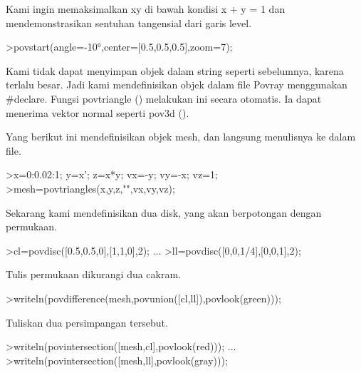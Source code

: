 \documentclass{article}
\begin{document}
\begin{eulernotebook}
\begin{eulercomment}
\begin{eulercomment}
\begin{eulercomment}
\begin{eulercomment}
\begin{eulercomment}
\begin{eulercomment}
\begin{eulercomment}
\begin{eulercomment}
\begin{eulercomment}
\begin{eulercomment}
\begin{eulercomment}
\begin{eulercomment}
\begin{eulercomment}
\begin{eulercomment}
\begin{eulercomment}
\begin{eulercomment}
\begin{eulercomment}
\begin{eulercomment}
\begin{eulercomment}
\begin{eulercomment}
\begin{eulercomment}
\begin{eulercomment}
\begin{eulercomment}
\begin{eulercomment}
\begin{eulercomment}
\begin{eulercomment}
\begin{eulercomment}
\begin{eulercomment}
\begin{eulercomment}
Kami ingin memaksimalkan xy di bawah kondisi x + y = 1 dan
mendemonstrasikan sentuhan tangensial dari garis level.
\end{eulercomment}
\begin{eulerprompt}
>povstart(angle=-10°,center=[0.5,0.5,0.5],zoom=7);
\end{eulerprompt}
\begin{eulercomment}
Kami tidak dapat menyimpan objek dalam string seperti sebelumnya,
karena terlalu besar. Jadi kami mendefinisikan objek dalam file Povray
menggunakan #declare. Fungsi povtriangle () melakukan ini secara
otomatis. Ia dapat menerima vektor normal seperti pov3d ().

Yang berikut ini mendefinisikan objek mesh, dan langsung menulisnya ke
dalam file.
\end{eulercomment}
\begin{eulerprompt}
>x=0:0.02:1; y=x'; z=x*y; vx=-y; vy=-x; vz=1;
>mesh=povtriangles(x,y,z,"",vx,vy,vz);
\end{eulerprompt}
\begin{eulercomment}
Sekarang kami mendefinisikan dua disk, yang akan berpotongan dengan
permukaan.
\end{eulercomment}
\begin{eulerprompt}
>cl=povdisc([0.5,0.5,0],[1,1,0],2); ...
>ll=povdisc([0,0,1/4],[0,0,1],2);
\end{eulerprompt}
\begin{eulercomment}
Tulis permukaan dikurangi dua cakram.
\end{eulercomment}
\begin{eulerprompt}
>writeln(povdifference(mesh,povunion([cl,ll]),povlook(green)));
\end{eulerprompt}
\begin{eulercomment}
Tuliskan dua persimpangan tersebut.
\end{eulercomment}
\begin{eulerprompt}
>writeln(povintersection([mesh,cl],povlook(red))); ...
>writeln(povintersection([mesh,ll],povlook(gray)));
\end{eulerprompt}

\end{eulercomment}
\end{eulercomment}
\end{eulercomment}
\end{eulercomment}
\end{eulercomment}
\end{eulercomment}
\end{eulercomment}
\end{eulercomment}
\end{eulercomment}
\end{eulercomment}
\end{eulercomment}
\end{eulercomment}
\end{eulercomment}
\end{eulercomment}
\end{eulercomment}
\end{eulercomment}
\end{eulercomment}
\end{eulercomment}
\end{eulercomment}
\end{eulercomment}
\end{eulercomment}
\end{eulercomment}
\end{eulercomment}
\end{eulercomment}
\end{eulercomment}
\end{eulercomment}
\end{eulercomment}
\end{eulercomment}
\end{eulernotebook}
\end{document}
